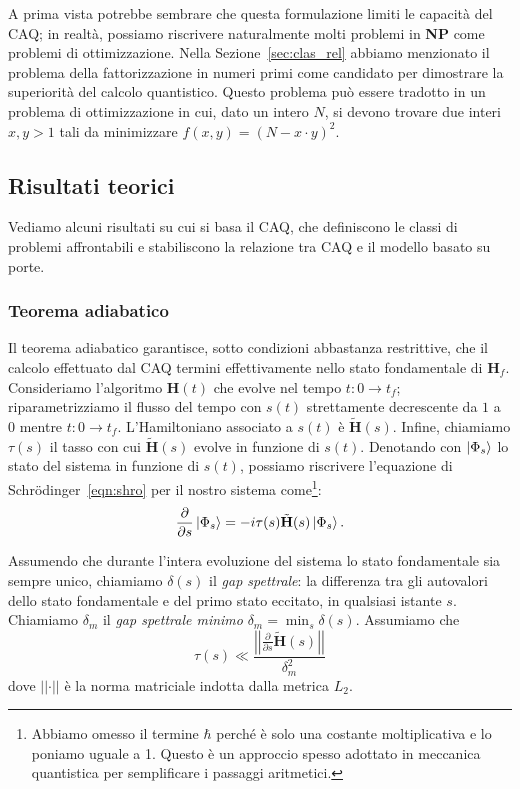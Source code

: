 A prima vista potrebbe sembrare che questa formulazione limiti le capacità del CAQ; in realtà, possiamo riscrivere naturalmente molti problemi in \textbf{NP} come problemi di ottimizzazione. Nella Sezione~\ref{sec:clas_rel} abbiamo menzionato il problema della fattorizzazione in numeri primi come candidato per dimostrare la superiorità del calcolo quantistico. Questo problema può essere tradotto in un problema di ottimizzazione in cui, dato un intero $N$, si devono trovare due interi $x, y > 1$ tali da minimizzare $f(x,y) = (N - x\cdot y)^2$.
\subsection{Risultati teorici}
Vediamo alcuni risultati su cui si basa il CAQ, che definiscono le classi di problemi affrontabili e stabiliscono la relazione tra CAQ e il modello basato su porte.
\subsubsection*{Teorema adiabatico}
Il teorema adiabatico garantisce, sotto condizioni abbastanza restrittive, che il calcolo effettuato dal CAQ termini effettivamente nello stato fondamentale di $\mathbf{H}_f$. Consideriamo l'algoritmo $\mathbf{H}(t)$ che evolve nel tempo $t:0 \rightarrow t_f$; riparametrizziamo il flusso del tempo con $s(t)$ strettamente decrescente da $1$ a $0$ mentre $t:0 \rightarrow t_f$. L'Hamiltoniano associato a $s(t)$ è $\tilde{\mathbf{H}}(s)$. Infine, chiamiamo $\tau(s)$ il tasso con cui $\tilde{\mathbf{H}}(s)$ evolve in funzione di $s(t)$. Denotando con $\Ket{\Phi_s}$ lo stato del sistema in funzione di $s(t)$, possiamo riscrivere l'equazione di Schrödinger~\ref{eqn:shro} per il nostro sistema come\footnote{Abbiamo omesso il termine $\hbar$ perché è solo una costante moltiplicativa e lo poniamo uguale a 1. Questo è un approccio spesso adottato in meccanica quantistica per semplificare i passaggi aritmetici.}:
\[
\frac{\partial}{\partial s} \Ket{\Phi_s} =  -i \tau(s)\tilde{\mathbf{H}}(s)\Ket{\Phi_s}.
\]

Assumendo che durante l'intera evoluzione del sistema lo stato fondamentale sia sempre unico, chiamiamo $\delta(s)$ il \emph{gap spettrale}: la differenza tra gli autovalori dello stato fondamentale e del primo stato eccitato, in qualsiasi istante $s$. Chiamiamo $\delta_m$ il \emph{gap spettrale minimo} $\delta_m = \min_s \delta(s)$. Assumiamo che
\begin{equation}
	\label{eqn:bound_tau}
	\tau(s) \ll \frac{\left|\left|\frac{\partial}{\partial s} \tilde{\mathbf{H}}(s)\right|\right|}{\delta_m ^2}
\end{equation}
dove $\left|\left|\cdot\right|\right|$ è la norma matriciale indotta dalla metrica $L_2$.


